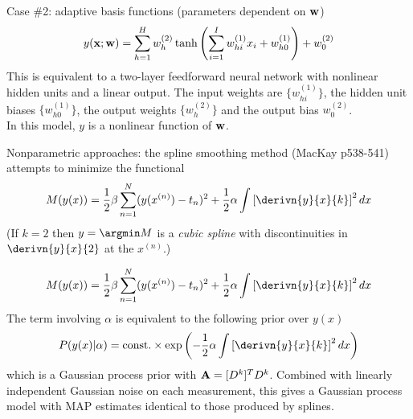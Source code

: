 \documentclass{beamer}
\begin{document}
\begin{frame}

Case \#2: adaptive basis functions (parameters dependent on ${\bf w}$)
\[
y({\bf x};{\bf w}) = \sum_{h=1}^H w_h^{(2)} \tanh \left( \sum_{i=1}^I w_{hi}^{(1)} x_i + w_{h0}^{(1)} \right) + w_0^{(2)}
\]
This is equivalent to a two-layer feedforward neural network with nonlinear hidden units and a linear output.
The input weights are $\{ w_{hi}^{(1)} \}$, the hidden unit biases $\{ w_{h0}^{(1)} \}$,
the output weights $\{ w_h^{(2)} \}$ and the output bias $w_0^{(2)}$.
\\
In this model, $y$ is a nonlinear function of ${\bf w}$.
\end{frame}{}

\begin{frame}
Nonparametric approaches: the spline smoothing method (MacKay p538-541) attempts to minimize the functional
\[
M(y(x)) = \frac{1}{2} \beta \sum_{n=1}^N (y(x^{(n)}) - t_n)^2 + \frac{1}{2} \alpha \int \left[ \derivn{y}{x}{k} \right]^2 dx
\]
(If $k=2$ then $y = \argmin M$ is a {\em cubic spline} with discontinuities in $\derivn{y}{x}{2}$ at the $x^{(n)}$.)
\end{frame}{}

\begin{frame}
\[
M(y(x)) = \frac{1}{2} \beta \sum_{n=1}^N (y(x^{(n)}) - t_n)^2 + \frac{1}{2} \alpha \int \left[ \derivn{y}{x}{k} \right]^2 dx
\]
The term involving $\alpha$ is equivalent to the following prior over $y(x)$
\[
P(y(x)|\alpha) = \mbox{const.} \times \exp \left( -\frac{1}{2}\alpha\int \left[ \derivn{y}{x}{k} \right]^2 dx \right)
\]
which is a Gaussian process prior with ${\bf A} = [D^k]^T D^k$.
Combined with linearly independent Gaussian noise on each measurement,
this gives a Gaussian process model with MAP estimates identical to those produced by splines.
\end{frame}{}
\end{document}
